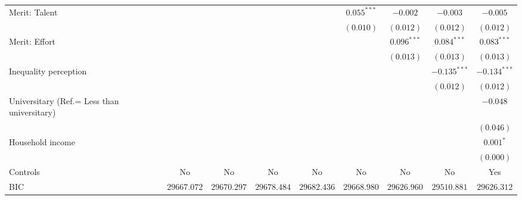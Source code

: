 \documentclass[
]{article}
\begin{document}
\begin{table}
{\begin{center}
{\begin{tabular}{l c c c c c c c c}
Merit: Talent                               &                &                &                &                & $0.055^{***}$  & $-0.002$       & $-0.003$       & $-0.005$       \\
                                            &                &                &                &                & $(0.010)$      & $(0.012)$      & $(0.012)$      & $(0.012)$      \\
Merit: Effort                               &                &                &                &                &                & $0.096^{***}$  & $0.084^{***}$  & $0.083^{***}$  \\
                                            &                &                &                &                &                & $(0.013)$      & $(0.013)$      & $(0.013)$      \\
Inequality perception                       &                &                &                &                &                &                & $-0.135^{***}$ & $-0.134^{***}$ \\
                                            &                &                &                &                &                &                & $(0.012)$      & $(0.012)$      \\
Universitary (Ref.= Less than universitary) &                &                &                &                &                &                &                & $-0.048$       \\
                                            &                &                &                &                &                &                &                & $(0.046)$      \\
Household income                            &                &                &                &                &                &                &                & $0.001^{*}$    \\
                                            &                &                &                &                &                &                &                & $(0.000)$      \\
\hline
Controls                                    & No             & No             & No             & No             & No             & No             & No             & Yes            \\
BIC                                         & $29667.072$    & $29670.297$    & $29678.484$    & $29682.436$    & $29668.980$    & $29626.960$    & $29510.881$    & $29626.312$    \\

\end{tabular}}
\end{center}}
\end{table}
\end{document}

